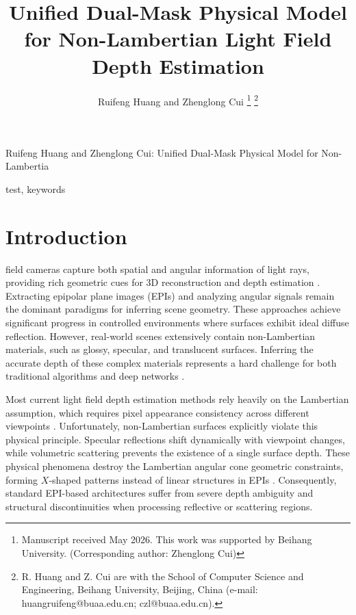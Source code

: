 \documentclass[lettersize,journal]{IEEEtran}
\begin{document}
\title{Unified Dual-Mask Physical Model for Non-Lambertian Light Field Depth Estimation}

\author{Ruifeng Huang and Zhenglong Cui
\thanks{Manuscript received May 2026. This work was supported by Beihang University. (Corresponding author: Zhenglong Cui)}
\thanks{R. Huang and Z. Cui are with the School of Computer Science and Engineering, Beihang University, Beijing, China (e-mail: huangruifeng@buaa.edu.cn; czl@buaa.edu.cn).}}

%
{Ruifeng Huang and Zhenglong Cui: Unified Dual-Mask Physical Model for Non-Lambertia}

\maketitle

\begin{abstract}

\end{abstract}

\begin{IEEEkeywords}
test, keywords
\end{IEEEkeywords}

\section{Introduction}

 field cameras capture both spatial and angular information of light rays, providing rich geometric cues for 3D reconstruction and depth estimation \cite{lightfieldimagingdepthesti}. Extracting epipolar plane images (EPIs) and analyzing angular signals remain the dominant paradigms for inferring scene geometry. These approaches achieve significant progress in controlled environments where surfaces exhibit ideal diffuse reflection. However, real-world scenes extensively contain non-Lambertian materials, such as glossy, specular, and translucent surfaces. Inferring the accurate depth of these complex materials represents a hard challenge for both traditional algorithms and deep networks \cite{nonLambertiansurfacesspecul}.

Most current light field depth estimation methods rely heavily on the Lambertian assumption, which requires pixel appearance consistency across different viewpoints \cite{photoconsistencyLambertiana}. Unfortunately, non-Lambertian surfaces explicitly violate this physical principle. Specular reflections shift dynamically with viewpoint changes, while volumetric scattering prevents the existence of a single surface depth. These physical phenomena destroy the Lambertian angular cone geometric constraints, forming $X$-shaped patterns instead of linear structures in EPIs \cite{epipolarplaneimagegeometric}. Consequently, standard EPI-based architectures suffer from severe depth ambiguity and structural discontinuities when processing reflective or scattering regions.
\end{document}
